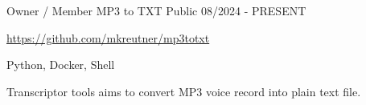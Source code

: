 \begin{cventries}
  \cventry
    {Owner / Member} %
    {MP3 to TXT} %
    {Public} %
    {08/2024 - PRESENT} %
    {
      \url{https://github.com/mkreutner/mp3totxt}
      \newline \vspace{12pt}
      \begin{cvitems} %
        \item {Python, Docker, Shell}
        \item {Transcriptor tools aims to convert MP3 voice record into plain text file.}
      \end{cvitems}
    }

\end{cventries}
